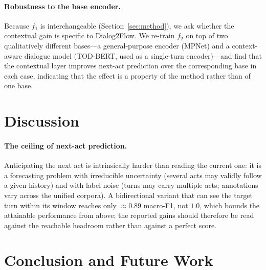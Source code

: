 \documentclass[11pt]{article}
\begin{document}
\paragraph{Robustness to the base encoder.}
Because $f_1$ is interchangeable (Section~\ref{sec:method}), we ask whether the contextual gain is
specific to Dialog2Flow. We re-train $f_2$ on top of two qualitatively different bases---a
general-purpose encoder (MPNet) and a context-aware dialogue model (TOD-BERT, used as a single-turn
encoder)---and find that the contextual layer improves next-act prediction over the corresponding base
in each case, indicating that the effect is a property of the method rather than of one base.

\section{Discussion}
\label{sec:discussion}


\paragraph{The ceiling of next-act prediction.}
Anticipating the next act is intrinsically harder than reading the current one: it is a forecasting
problem with irreducible uncertainty (several acts may validly follow a given history) and with label
noise (turns may carry multiple acts; annotations vary across the unified corpora). A bidirectional
variant that can see the target turn within its window reaches only $\approx 0.89$ macro-F1, not
$1.0$, which bounds the attainable performance from above; the reported gains should therefore be
read against the reachable headroom rather than against a perfect score.

\section{Conclusion and Future Work}
\label{sec:conclusion}
\end{document}
